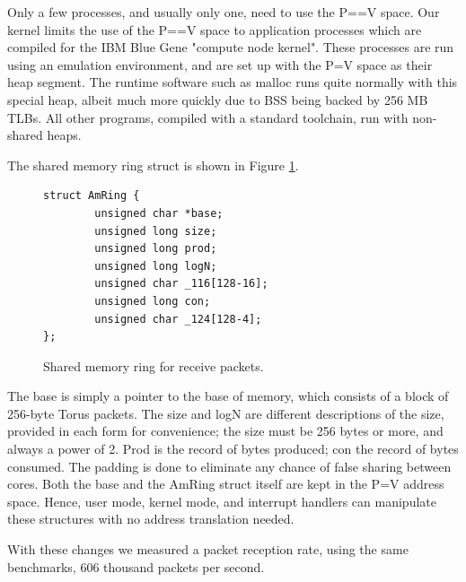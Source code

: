\documentclass[letterpaper,twocolumn,10pt]{article}
\begin{document}
Only a few processes, and usually only one, need to use the P==V space. Our kernel limits the use of the P==V space to application processes which are compiled for the
IBM Blue Gene "compute node kernel". These
processes are run using an emulation environment\cite{plan9bgp}, and are set up with the P=V 
space as their heap segment. The runtime software such as malloc runs quite normally with this 
special heap, albeit much more quickly due to BSS being backed by 256 MB TLBs. All other programs,
compiled with a standard toolchain, run with non-shared heaps.

The shared memory ring struct is shown in Figure \ref{ring}. 
\begin{figure}
\begin{verbatim}
struct AmRing {
        unsigned char *base;
        unsigned long size;
        unsigned long prod;
        unsigned long logN;
        unsigned char _116[128-16];
        unsigned long con;
        unsigned char _124[128-4];
};
\end{verbatim}
\caption{\label{ring}Shared memory ring for receive packets.}
\end{figure}

The base is simply a pointer to the base of memory, which consists of a block of 256-byte Torus packets. 
The size and logN are different descriptions of the size, provided in each form for convenience;
 the size must be 256 bytes or more, and always a power of 2. Prod
is the record of bytes produced; con the record of bytes consumed. The padding is done to eliminate any 
chance of false sharing between cores. Both the base and the AmRing struct itself are kept in the P=V 
address space. Hence, user mode, kernel mode, and interrupt handlers can manipulate these structures
with no address translation needed. 

With these changes we measured a packet reception rate, using the same benchmarks, 
606 thousand packets
per second. 
\end{document}
